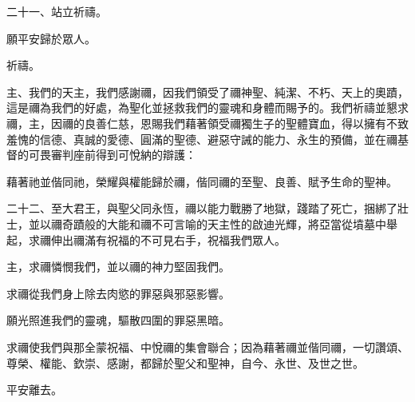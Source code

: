 \par

二十一、站立祈禱。\par

\par

願平安歸於眾人。\par

\par

祈禱。\par

\par

主、我們的天主，我們感謝禰，因我們領受了禰神聖、純潔、不朽、天上的奧蹟，這是禰為我們的好處，為聖化並拯救我們的靈魂和身體而賜予的。我們祈禱並懇求禰，主，因禰的良善仁慈，恩賜我們藉著領受禰獨生子的聖體寶血，得以擁有不致羞愧的信德、真誠的愛德、圓滿的聖德、避惡守誡的能力、永生的預備，並在禰基督的可畏審判座前得到可悅納的辯護：\par

\par

藉著祂並偕同祂，榮耀與權能歸於禰，偕同禰的至聖、良善、賦予生命的聖神。\par

\par

二十二、至大君王，與聖父同永恆，禰以能力戰勝了地獄，踐踏了死亡，捆綁了壯士，並以禰奇蹟般的大能和禰不可言喻的天主性的啟迪光輝，將亞當從墳墓中舉起，求禰伸出禰滿有祝福的不可見右手，祝福我們眾人。\par

主，求禰憐憫我們，並以禰的神力堅固我們。\par

求禰從我們身上除去肉慾的罪惡與邪惡影響。\par

願光照進我們的靈魂，驅散四圍的罪惡黑暗。\par

求禰使我們與那全蒙祝福、中悅禰的集會聯合；因為藉著禰並偕同禰，一切讚頌、尊榮、權能、欽崇、感謝，都歸於聖父和聖神，自今、永世、及世之世。\par

\par

平安離去。\par

\par

